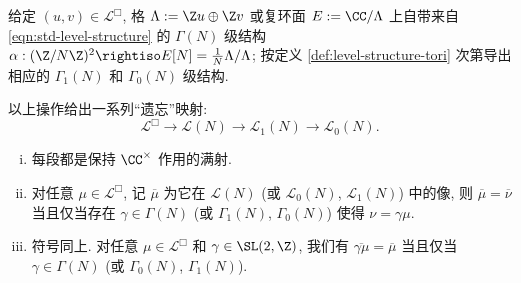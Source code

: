 给定 $(u, v) \in \mathcal{L}^\Box$, 格 $\Lambda := \Z u \oplus \Z v$ 或复环面 $E := \CC/\Lambda$ 上自带来自 \eqref{eqn:std-level-structure} 的 $\Gamma(N)$ 级结构 $\alpha: (\Z/N\Z)^2 \rightiso E[N] = \frac{1}{N} \Lambda/\Lambda$; 按定义 \ref{def:level-structure-tori} 次第导出相应的 $\Gamma_1(N)$ 和 $\Gamma_0(N)$ 级结构.

\begin{lemma}\label{prop:tori-N-oblivion}
	以上操作给出一系列``遗忘''映射:
	\[ \mathcal{L}^\Box \to \mathcal{L}(N) \to \mathcal{L}_1(N) \to \mathcal{L}_0(N). \]
	\begin{enumerate}[(i)]
		\item 每段都是保持 $\CC^\times$ 作用的满射.
		\item 对任意 $\mu \in \mathcal{L}^\Box$, 记 $\overline{\mu}$ 为它在 $\mathcal{L}(N)$ (或 $\mathcal{L}_0(N)$, $\mathcal{L}_1(N)$) 中的像, 则 $\overline{\mu} = \overline{\nu}$ 当且仅当存在 $\gamma \in \Gamma(N)$ (或 $\Gamma_1(N)$, $\Gamma_0(N)$) 使得 $\nu = \gamma\mu$.
		\item 符号同上. 对任意 $\mu \in \mathcal{L}^\Box$ 和 $\gamma \in \SL(2, \Z)$, 我们有 $\overline{\gamma\mu} = \overline{\mu}$ 当且仅当 $\gamma \in \Gamma(N)$ (或 $\Gamma_0(N)$, $\Gamma_1(N)$).
	\end{enumerate}
\end{lemma}
